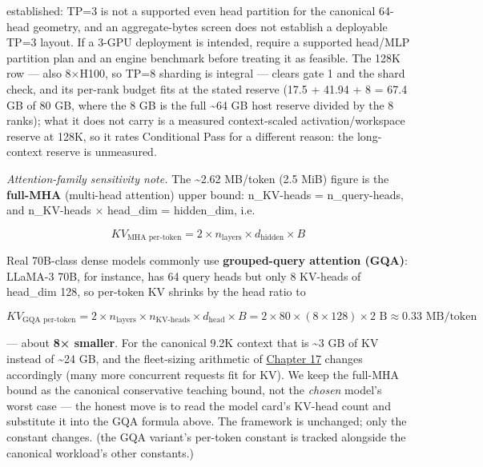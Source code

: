 {established: TP=3 is not a supported even head partition for the
canonical 64-head geometry, and an aggregate-bytes screen does not
establish a deployable TP=3 layout. If a 3-GPU deployment is intended,
require a supported head/MLP partition plan and an engine benchmark
before treating it as feasible. The 128K row --- also 8×H100, so TP=8
sharding is integral --- clears gate 1 and the shard check, and its
per-rank budget fits at the stated reserve (17.5 + 41.94 + 8 = 67.4 GB
of 80 GB, where the 8 GB is the full \textasciitilde64 GB host reserve
divided by the 8 ranks); what it does not carry is a measured
context-scaled activation/workspace reserve at 128K, so it rates
Conditional Pass for a different reason: the long-context reserve is
unmeasured.}

\emph{Attention-family sensitivity note.} The \textasciitilde2.62
MB/token (2.5 MiB) figure is the \textbf{full-MHA} (multi-head
attention) upper bound: n\_KV-heads = n\_query-heads, and n\_KV-heads ×
head\_dim = hidden\_dim, i.e.

\[
KV_{\text{MHA per-token}} = 2 \times n_\text{layers} \times d_\text{hidden} \times B
\]

Real 70B-class dense models commonly use \textbf{grouped-query attention
(GQA)}: LLaMA-3 70B, for instance, has 64 query heads but only 8
KV-heads of head\_dim 128, so per-token KV shrinks by the head ratio to

\[
KV_{\text{GQA per-token}} = 2 \times n_\text{layers} \times n_\text{KV-heads} \times d_\text{head} \times B = 2 \times 80 \times (8 \times 128) \times 2 \text{ B} \approx 0.33 \text{ MB/token}
\]

--- about \textbf{8× smaller}. For the canonical 9.2K context that is
\textasciitilde3 GB of KV instead of \textasciitilde24 GB, and the
fleet-sizing arithmetic of \hyperref[chap:17]{Chapter 17} changes accordingly (many more
concurrent requests fit for KV). We keep the full-MHA bound as the
canonical conservative teaching bound, not the \emph{chosen} model's
worst case --- the honest move is to read the model card's KV-head count
and substitute it into the GQA formula above. The framework is
unchanged; only the constant changes. (the GQA variant's per-token
constant is tracked alongside the canonical workload's other constants.)

